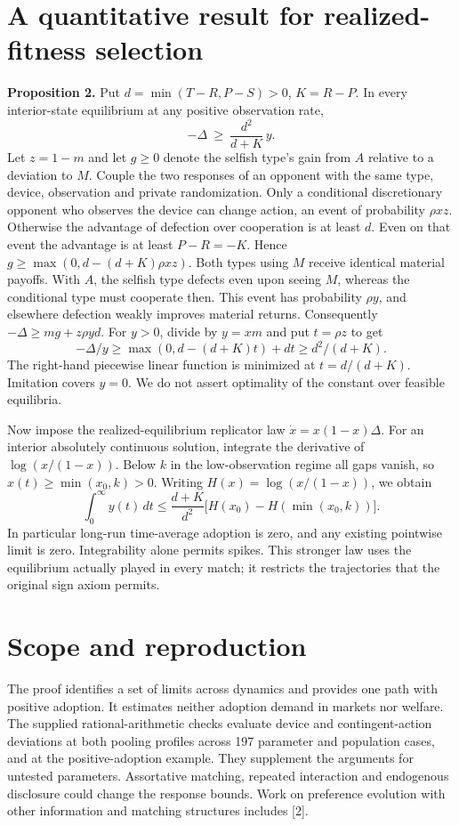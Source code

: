 \documentclass[11pt]{article}
\begin{document}
\section{A quantitative result for realized-fitness selection}
\textbf{Proposition 2.} Put $d=\min(T-R,P-S)>0$, $K=R-P$. In every interior-state equilibrium at any positive observation rate,
\[
  -\Delta \ \ge\ \frac{d^2}{d+K}\,y .
\]
Let $z=1-m$ and let $g\ge0$ denote the selfish type's gain from $A$ relative to a deviation to $M$. Couple the two responses of an opponent with the same type, device, observation and private randomization. Only a conditional discretionary opponent who observes the device can change action, an event of probability $\rho xz$. Otherwise the advantage of defection over cooperation is at least $d$. Even on that event the advantage is at least $P-R=-K$. Hence $g\ge\max(0,d-(d+K)\rho xz)$. Both types using $M$ receive identical material payoffs. With $A$, the selfish type defects even upon seeing $M$, whereas the conditional type must cooperate then. This event has probability $\rho y$, and elsewhere defection weakly improves material returns. Consequently $-\Delta\ge mg+z\rho y d$. For $y>0$, divide by $y=xm$ and put $t=\rho z$ to get
\[
  -\Delta/y\ge\max(0,d-(d+K)t)+dt\ge d^2/(d+K).
\]
The right-hand piecewise linear function is minimized at $t=d/(d+K)$. Imitation covers $y=0$. We do not assert optimality of the constant over feasible equilibria.

Now impose the realized-equilibrium replicator law $\dot x=x(1-x)\Delta$. For an interior absolutely continuous solution, integrate the derivative of $\log(x/(1-x))$. Below $k$ in the low-observation regime all gaps vanish, so $x(t)\ge\min(x_0,k)>0$. Writing $H(x)=\log(x/(1-x))$, we obtain
\[
 \int_0^\infty y(t)\,dt
 \le \frac{d+K}{d^2}\bigl[H(x_0)-H(\min(x_0,k))\bigr].
\]
In particular long-run time-average adoption is zero, and any existing pointwise limit is zero. Integrability alone permits spikes. This stronger law uses the equilibrium actually played in every match; it restricts the trajectories that the original sign axiom permits.

\section{Scope and reproduction}
The proof identifies a set of limits across dynamics and provides one path with positive adoption. It estimates neither adoption demand in markets nor welfare. The supplied rational-arithmetic checks evaluate device and contingent-action deviations at both pooling profiles across 197 parameter and population cases, and at the positive-adoption example. They supplement the arguments for untested parameters. Assortative matching, repeated interaction and endogenous disclosure could change the response bounds. Work on preference evolution with other information and matching structures includes [2].
\end{document}

